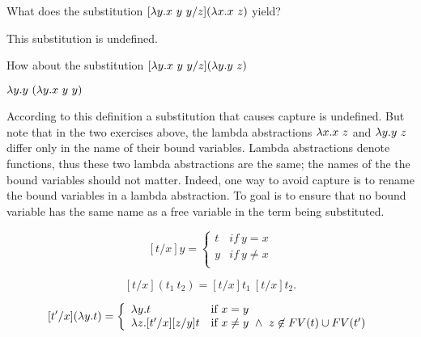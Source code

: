 \begin{flex}
\begin{exercise}
\label{xrcs:lambda::sub::sub-undef}
What does the substitution $[\lambda y.x~y~y/z](\lambda x.x~z)$ yield?
\end{exercise}
\begin{solution}
\label{sol:lambda::sub-basic}
This substitution is undefined.
\end{solution}
\end{flex}

\begin{flex}
\begin{exercise}
\label{xrcs:lambda::sub::sub-rename}
How about the substitution  $[\lambda y.x~y~y/z](\lambda y.y~z)$
\end{exercise}
\begin{solution}
$\lambda y.y~(\lambda y.x~y~y)$
\end{solution}
\end{flex}

According to this definition a substitution that causes capture is
undefined.  But note that in the two exercises above, the lambda
abstractions $\lambda x.x~z$ and $\lambda y.y~z$ differ only in the name of
their bound variables.  
%
Lambda abstractions denote functions, thus
these two lambda abstractions are the same; the names of the
the bound variables should not matter.
%
Indeed, one way to avoid capture is to rename the bound variables in a
lambda abstraction.  To goal is to ensure that no bound variable has
the same name as a free variable in the term being substituted.


\begin{definition}
\label{def:lambda::sub::exp}
\[
[t/x]y = \left\{ \begin{array}{ll}
        t & if~y = x \\
        y & if~y\neq x \\
        \end{array} \right.
\]


\[
[t/x](t_1~t_2) = [t/x]t_1~[t/x]t_2.
 \]



\[[t'/x](\lambda y.t)  =
\left\{ \begin{array}{ll}
        \lambda y.t&\mbox{if}~x = y \\
        \lambda z. [t'/x] [z/y] t
        &\mbox{if}~ x \not= y ~ \land ~ z \not\in FV(t) \cup FV(t') \\
       \end{array} \right. \]
\end{definition}

